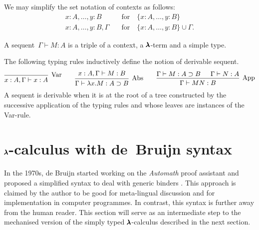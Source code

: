 \begin{notation} We may simplify the set notation of contexts as follows:
  \begin{align*}
    x:A, \dots, y:B         \quad &\text{for} \quad \{ x:A, \dots, y:B \} \\
    x:A, \dots, y:B, \Gamma \quad &\text{for} \quad \{ x:A, \dots, y:B \} \cup \Gamma.
  \end{align*}
\end{notation}

\begin{definition}[Sequent]
  A sequent~$\Gamma \vdash M:A$ is a triple of a context, a $\pmb{\lambda}$-term and a simple type.
\end{definition}

\begin{definition}
  \label{typing_rules}
  The following typing rules inductively define the notion of derivable sequent.
  \[
    \begin{prooftree}
      \infer0[Var]{ x:A, \Gamma \vdash x:A } 
    \end{prooftree}
    \qquad
    \begin{prooftree}
      \hypo{ x:A, \Gamma \vdash M:B }
      \infer1[Abs]{ \Gamma \vdash \lambda x . M : A \supset B  } 
    \end{prooftree}
    \qquad
    \begin{prooftree}
      \hypo{ \Gamma \vdash M : A \supset B }
      \hypo{ \Gamma \vdash N : A }	
      \infer2[App]{ \Gamma \vdash M N : B } 
    \end{prooftree}
  \]
  A sequent is derivable when it is at the root of a tree constructed by the successive application of the typing rules and whose leaves are instances of the Var-rule.  
\end{definition}


\section{$\pmb{\lambda}$-calculus with de~Bruijn syntax}

In the 1970s, de Bruijn started working on the \textit{Automath} proof assistant and proposed a simplified syntax to deal with generic binders \cite{deBruijn}.
This approach is claimed by the author to be good for meta-lingual discussion and for implementation in computer programmes.
In contrast, this syntax is further away from the human reader.
This section will serve as an intermediate step to the mechanised version of the simply typed $\pmb{\lambda}$-calculus described in the next section.

